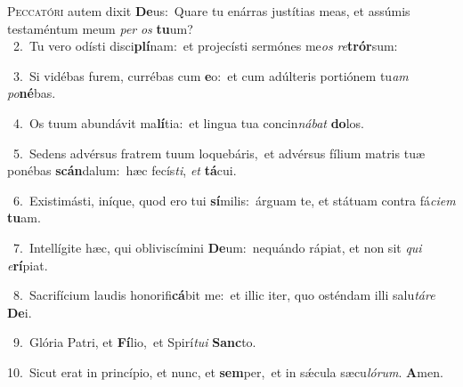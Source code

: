 \lettrine{\initial\textcolor{\initialcolor}{P}}{eccatóri} autem dixit \textbf{De}\-us:~\star Quare tu enárras justítias meas, et assúmis testaméntum meum \textit{per} \textit{os} \textbf{tu}\-um?\\
{\numbfont\textcolor{\numbcolor}{~2.}}~Tu vero odísti disci\-\textbf{plí}\-nam:~\star et projecísti sermónes me\textit{os} \textit{re}\-\textbf{trór}sum:\par
{\numbfont\textcolor{\numbcolor}{~3.}}~Si vidébas furem, currébas cum \textbf{e}\-o:~\star et cum adúlteris portiónem tu\textit{am} \textit{po}\-\textbf{né}bas.\par
{\numbfont\textcolor{\numbcolor}{~4.}}~Os tuum abundávit ma\-\textbf{lí}\-tia:~\star et lingua tua concin\-\textit{ná}\-\textit{bat} \textbf{do}\-los.\par
{\numbfont\textcolor{\numbcolor}{~5.}}~Sedens advérsus fratrem tuum loquebáris,~\dagger et advérsus fílium matris tuæ ponébas \textbf{scán}\-dalum:~\star hæc fecís\-\textit{ti}\-, \textit{et} \textbf{tá}\-cui.\par
{\numbfont\textcolor{\numbcolor}{~6.}}~Existimásti, iníque, quod ero tui \textbf{sí}\-milis:~\star árguam te, et státuam contra fá\-\textit{ci}\-\textit{em} \textbf{tu}\-am.\par
{\numbfont\textcolor{\numbcolor}{~7.}}~Intellígite hæc, qui obliviscímini \textbf{De}\-um:~\star nequándo rápiat, et non sit \textit{qui} \textit{e}\-\textbf{rí}piat.\par
{\numbfont\textcolor{\numbcolor}{~8.}}~Sacrifícium laudis honorifi\-\textbf{cá}\-bit me:~\star et illic iter, quo osténdam illi salu\-\textit{tá}\-\textit{re} \textbf{De}\-i.\par
{\numbfont\textcolor{\numbcolor}{~9.}}~Glória Patri, et \textbf{Fí}\-lio,~\star et Spirí\-\textit{tu}\-\textit{i} \textbf{Sanc}\-to.\par
{\numbfont\textcolor{\numbcolor}{10.}}~Sicut erat in princípio, et nunc, et \textbf{sem}\-per,~\star et in sǽcula sæcu\-\textit{ló}\-\textit{rum}. \textbf{A}\-men.\par
